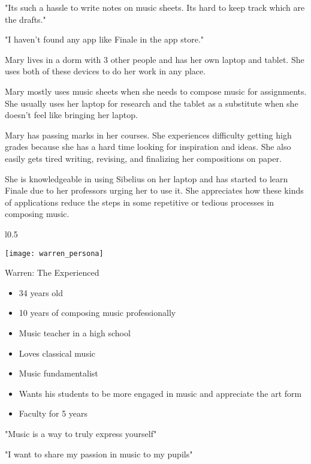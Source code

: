 "Its such a hassle to write notes on music sheets. Its hard to keep track which are the drafts."

"I haven't found any app like Finale in the app store."

Mary lives in a dorm with 3 other people and has her own laptop and tablet. She uses both of these devices to do her work in any place.

Mary mostly uses music sheets when she needs to compose music for assignments. She usually uses her laptop for research and the tablet as a substitute when she doesn't feel like bringing her laptop.

Mary has passing marks in her courses. She experiences difficulty getting high grades because she has a hard time looking for inspiration and ideas. She also easily gets tired writing, revising, and finalizing her compositions on paper.

She is knowledgeable in using Sibelius on her laptop and has started to learn Finale due to her professors urging her to use it. She appreciates how these kinds of applications reduce the steps in some repetitive or tedious processes in composing music. \newline

\begin{wrapfigure}{l}{0.5\textwidth}
  \begin{center}
  
    \texttt{[image: warren\_persona]}
  \end{center}
\end{wrapfigure}

Warren: The Experienced \newline

\begin{itemize}
\item 34 years old
\item 10 years of composing music professionally
\item Music teacher in a high school
\item Loves classical music
\item Music fundamentalist
\item Wants his students to be more engaged in music and appreciate the art form
\item Faculty for 5 years
\end{itemize}

"Music is a way to truly express yourself"

"I want to share my passion in music to my pupils"

